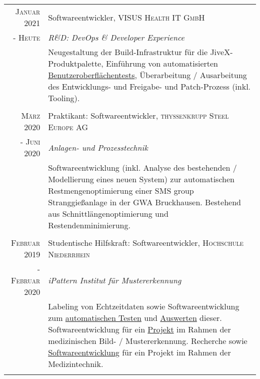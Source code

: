 \documentclass[10pt,a4paper]{article}
\begin{document}
\begin{tabular}{r|p{11cm}}
	\textsc{Januar} 2021 	& Softwareentwickler, \textsc{VISUS Health IT GmbH} \\
	- \textsc{Heute} 		& \emph{R\&D: DevOps \& Developer Experience} \\
						& \footnotesize{Neugestaltung der Build-Infrastruktur f\"ur die JiveX-Produktpalette, Einf\"uhrung von automatisierten \href{https://www.qfs.de}{Benutzeroberfl\"achentests}, \"Uberarbeitung / Ausarbeitung des Entwicklungs- und Freigabe- und Patch-Prozess (inkl. Tooling).} \\
	\multicolumn{2}{c}{} \\
	
	\textsc{M\"arz} 2020 		& Praktikant: Softwareentwickler, \textsc{thyssenkrupp Steel Europe AG} \\
	- \textsc{Juni} 2020		& \emph{Anlagen- und Prozesstechnik} \\
						& \footnotesize{Softwareentwicklung (inkl. Analyse des bestehenden / Modellierung eines neuen System) zur automatischen Restmengenoptimierung einer SMS group Stranggie\ss anlage in der GWA Bruckhausen. Bestehend aus Schnittl\"angenoptimierung und Restendenminimierung.} \\
	\multicolumn{2}{c}{} \\

 	\textsc{Februar} 2019	& Studentische Hilfskraft: Softwareentwickler, \textsc{Hochschule Niederrhein} \\
	- \textsc{Februar} 2020	& \emph{iPattern Institut f\"ur Mustererkennung} \\
						& \footnotesize{Labeling von Echtzeitdaten sowie Softwareentwicklung zum \href{https://github.com/thahnen/labelbox-export-minifier}{automatischen Testen} und \href{https://github.com/thahnen/labelbox-scripts-etc}{Auswerten} dieser. Softwareentwicklung f\"ur ein \href{https://www.hs-niederrhein.de/ipattern/nachrichten-detailseite/?tx_news_pi1\%5Bnews\%5D=9545\&cHash=3202e26ca1ce23d3b3231df1f5c5a573}{Projekt} im Rahmen der medizinischen Bild- / Mustererkennung. Recherche sowie \href{https://github.com/thahnen/elastix-scripts-etc}{Softwareentwicklung} f\"ur ein Projekt im Rahmen der Medizintechnik.} \\
	\multicolumn{2}{c}{} \\
	

\end{tabular}
\end{document}
